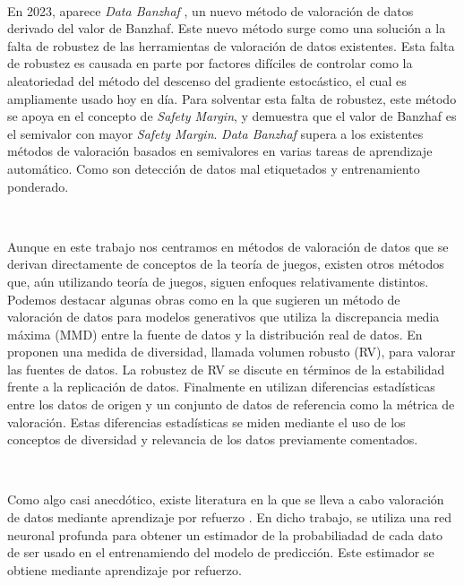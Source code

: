\

En 2023, aparece \textit{Data Banzhaf} \cite{dataBanzhaf},
un nuevo método de valoración de datos derivado del valor de Banzhaf.
Este nuevo método surge como una solución a la falta de robustez
de las herramientas de valoración de datos existentes. Esta falta de
robustez es causada en parte por factores difíciles de controlar como
la aleatoriedad del método del descenso del gradiente
estocástico, el cual es ampliamente usado hoy en día.
Para solventar esta falta de robustez, este método se apoya en el
concepto de \textit{Safety Margin}, y demuestra que el valor de
Banzhaf es el semivalor con mayor \textit{Safety Margin}. 
\textit{Data Banzhaf} supera a los existentes métodos de valoración
basados en semivalores en varias tareas de aprendizaje automático.
Como son detección de datos mal etiquetados y entrenamiento ponderado.

\

Aunque en este trabajo nos centramos en
métodos de valoración de datos que se derivan directamente de
conceptos de la teoría de juegos, existen otros métodos
que, aún utilizando teoría de juegos, siguen enfoques relativamente
distintos. Podemos destacar algunas obras como \cite{tay} en la que
sugieren un método de valoración de datos para modelos
generativos que utiliza la discrepancia media máxima (MMD) entre
la fuente de datos y la distribución real de datos. En \cite{xu}
proponen una medida de diversidad, llamada volumen robusto (RV),
para valorar las fuentes de datos. La robustez de RV se discute
en términos de la estabilidad frente a la replicación de datos.
Finalmente en \cite{amiri} utilizan diferencias estadísticas
entre los datos de origen y un conjunto de datos de referencia
como la métrica de valoración. Estas diferencias estadísticas
se miden mediante el uso de los conceptos de diversidad y
relevancia de los datos previamente comentados.

\

Como algo casi anecdótico, existe literatura en la que se lleva a
cabo valoración de datos mediante aprendizaje por refuerzo
\cite{reinforcement}. En dicho trabajo, se utiliza una red
neuronal profunda para obtener un estimador de la probabiliadad
de cada dato de ser usado en el entrenamiendo del modelo
de predicción. Este estimador se obtiene mediante aprendizaje
por refuerzo.
